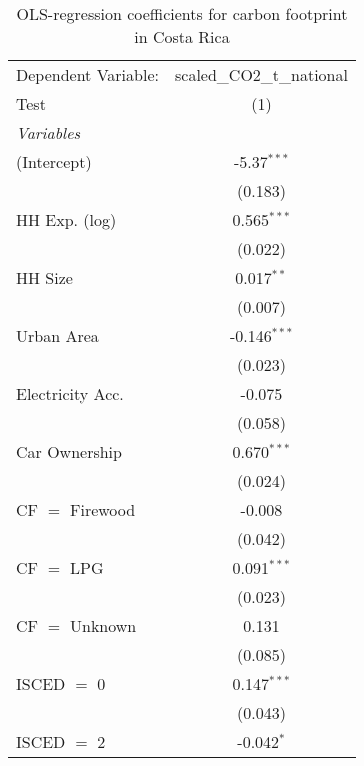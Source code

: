 
\begin{table}[htbp!]
   \centering
   \small
   \begin{adjustbox}{width = 1\textwidth, max height = 0.95\textheight, center}
      \begin{threeparttable}[b]
         \caption{\label{tab:OLS_2_CRI} OLS-regression coefficients for carbon footprint in Costa Rica}
         \begin{tabular}{lc}
            \tabularnewline \midrule \midrule
            Dependent Variable: & scaled\_CO2\_t\_national\\     
            Test                & (1)\\  
            \midrule
            \emph{Variables}\\
            (Intercept)         & -5.37$^{***}$\\   
                                & (0.183)\\   
            HH Exp. (log)       & 0.565$^{***}$\\   
                                & (0.022)\\   
            HH Size             & 0.017$^{**}$\\   
                                & (0.007)\\   
            Urban Area          & -0.146$^{***}$\\   
                                & (0.023)\\   
            Electricity Acc.    & -0.075\\   
                                & (0.058)\\   
            Car Ownership       & 0.670$^{***}$\\   
                                & (0.024)\\   
            CF $=$ Firewood     & -0.008\\   
                                & (0.042)\\   
            CF $=$ LPG          & 0.091$^{***}$\\   
                                & (0.023)\\   
            CF $=$ Unknown      & 0.131\\   
                                & (0.085)\\   
            ISCED $=$ 0         & 0.147$^{***}$\\   
                                & (0.043)\\   
            ISCED $=$ 2         & -0.042$^{*}$\\   

\end{tabular}
\end{threeparttable}
\end{adjustbox}
\end{table}
